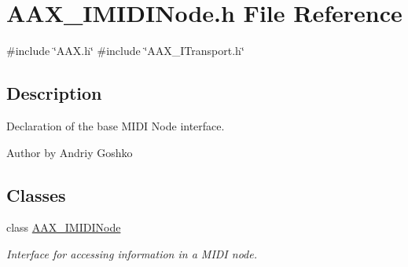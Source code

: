 \hypertarget{a00614}{}\section{A\+A\+X\+\_\+\+I\+M\+I\+D\+I\+Node.\+h File Reference}
\label{a00614}
{\ttfamily \#include \char`\"{}A\+A\+X.\+h\char`\"{}}\newline
{\ttfamily \#include \char`\"{}A\+A\+X\+\_\+\+I\+Transport.\+h\char`\"{}}\newline


\subsection{Description}
Declaration of the base M\+I\+DI Node interface. 

\begin{DoxyAuthor}{Author}
by Andriy Goshko 
\end{DoxyAuthor}
\subsection*{Classes}
\begin{DoxyCompactItemize}
\item 
class \mbox{\hyperlink{a01845}{A\+A\+X\+\_\+\+I\+M\+I\+D\+I\+Node}}
\begin{DoxyCompactList}\small\item\em Interface for accessing information in a M\+I\+DI node. \end{DoxyCompactList}\end{DoxyCompactItemize}
